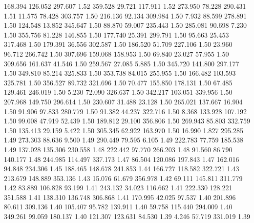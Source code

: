  168.394  126.052  297.607         1.52
 359.528   29.721  117.911         1.52
 273.950   78.228  290.431         1.51
  11.575   78.428  303.757         1.50
 216.136   92.134  309.984         1.50
   7.932   88.599  278.891         1.50
 124.548   13.852  345.647         1.50
  88.870   59.007  235.443         1.50
 285.081   90.698    7.230         1.50
 355.756   81.228  146.855         1.50
 177.740   25.391  299.791         1.50
  95.663   25.453  317.468         1.50
 179.391   36.556  302.587         1.50
 186.520   51.709  227.106         1.50
  23.960   96.712  266.742         1.50
 307.696  159.068  158.953         1.50
  69.840   23.027   57.955         1.50
 309.656  161.637   41.546         1.50
 259.567   27.085    5.885         1.50
 345.720  141.800  297.177         1.50
 349.810   85.214  325.833         1.50
 353.738   84.015  255.955         1.50
 166.482  103.593  325.781         1.50
 356.527   89.732  321.696         1.50
  70.477  155.850  178.131         1.50
  67.485  129.461  246.019         1.50
   5.230   72.090  326.637         1.50
 342.217  103.051  339.956         1.50
 207.968  149.750  296.614         1.50
 230.607   31.488   23.128         1.50
 265.021  137.667   16.904         1.50
  91.906   97.833  280.779         1.50
  91.382   44.237  322.716         1.50
   8.368  133.928  107.192         1.50
  99.008   47.919   52.439         1.50
 189.812   29.100  356.806         1.50
 269.943   85.803  332.759         1.50
 135.413   29.159    5.422         1.50
 305.345   62.922  163.970         1.50
  16.990    1.827  295.285         1.49
 273.303   88.636    9.500         1.49
 290.449   79.595    6.105         1.49
 222.783   77.759  185.538         1.49
 137.028  135.306  230.558         1.48
 222.442   97.770  266.203         1.48
  91.560   86.790  140.177         1.48
 244.985  114.497  337.173         1.47
  86.504  120.086  197.843         1.47
 162.016   94.848  234.306         1.45
 188.465  148.678  241.853         1.44
 166.727  118.582  322.721         1.43
 213.679  148.889  353.136         1.43
  15.076   61.679  356.978         1.42
  69.111  145.811  311.779         1.42
  83.889  106.828   93.199         1.41
 243.132   34.023  116.662         1.41
 222.330  128.221  351.588         1.41
 138.310  136.748  306.868         1.41
 170.995   42.025   97.537         1.40
 201.896   80.611  309.136         1.40
 105.407   95.782  139.911         1.40
  59.758  115.440  294.009         1.40
 349.261   99.059  180.137         1.40
 121.307  123.631   84.530         1.39
   4.246   57.719  331.019         1.39

